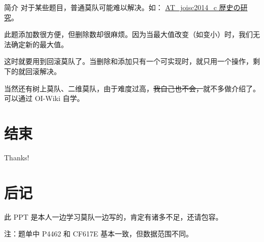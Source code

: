 \documentclass[table]{beamer}
\begin{document}
\begin{frame}{简介}
	对于某些题目，普通莫队可能难以解决。如：
	{\color{blue}\href{https://www.luogu.com.cn/problem/AT_joisc2014_c}{AT\_joisc2014\_c 歴史の研究}}。

	此题添加数很方便，但删除数却很麻烦。因为当最大值改变（如变小）时，我们无法确定新的最大值。

	这时就要用到回滚莫队了。当删除和添加只有一个可实现时，就只用一个操作，剩下的就回滚解决。
	\pause

	当然还有树上莫队、二维莫队，由于难度过高，\sout{我自己也不会，}就不多做介绍了。可以通过 OI-Wiki 自学。
\end{frame}

\section{结束}

\begin{frame}
	\begin{center}
		\Huge Thanks!
	\end{center}
\end{frame}

\section{后记}
\begin{frame}
	此 PPT 是本人一边学习莫队一边写的，肯定有诸多不足，还请包容。
	
	注：题单中 P4462 和 CF617E 基本一致，但数据范围不同。
\end{frame}
\end{document}
